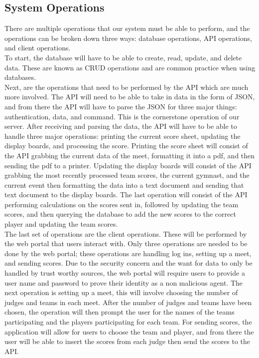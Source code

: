 \documentclass[letterpaper,10pt,draftclsnofoot,onecolumn,]{article}
\begin{document}
\subsection{System Operations}
There are multiple operations that our system must be able to perform, and the operations can be broken down three ways: database operations, API operations, and client operations. \\

\noindent To start, the database will have to be able to create, read, update, and delete data. These are known as CRUD operations and are common practice when using databases. \\

\noindent Next, are the operations that need to be performed by the API which are much more involved. The API will need to be able to take in data in the form of JSON, and from there the API will have to parse the JSON for three major things: authentication, data, and command. This is the cornerstone operation of our server. After receiving and parsing the data, the API will have to be able to handle three major operations: printing the current score sheet, updating the display boards, and processing the score. Printing the score sheet will consist of the API grabbing the current data of the meet, formatting it into a pdf, and then sending the pdf to a printer. Updating the display boards will consist of the API grabbing the most recently processed team scores, the current gymnast, and the current event then formatting the data into a text document and sending that text document to the display boards. The last operation will consist of the API performing calculations on the scores sent in, followed by updating the team scores, and then querying the database to add the new scores to the correct player and updating the team scores.  \\

\noindent The last set of operations are the client operations. These will be performed by the web portal that users interact with. Only three operations are needed to be done by the web portal; these operations are handling log ins, setting up a meet, and sending scores. Due to the security concern and the want for data to only be handled by trust worthy sources, the web portal will require users to provide a user name and password to prove their identity as a non malicious agent. The next operation is setting up a meet, this will involve choosing the number of judges and teams in each meet. After the number of judges and teams have been chosen, the operation will then prompt the user for the names of the teams participating and the players participating for each team. For sending scores, the application will allow for users to choose the team and player, and from there the user will be able to insert the scores from each judge then send the scores to the API.
\end{document}
